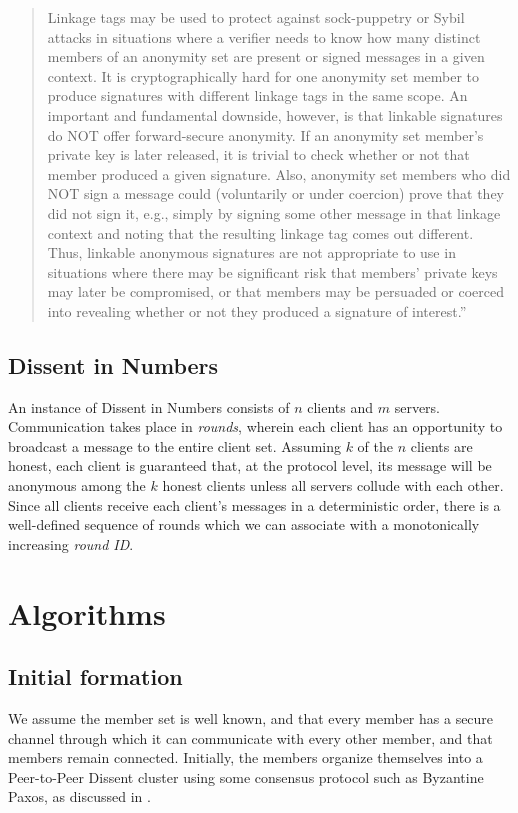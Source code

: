 \begin{quote}
Linkage tags may be used to protect against sock-puppetry or Sybil attacks in
situations where a verifier needs to know how many distinct members of an
anonymity set are present or signed messages in a given context. It is
cryptographically hard for one anonymity set member to produce signatures with
different linkage tags in the same scope. An important and fundamental downside,
however, is that linkable signatures do NOT offer forward-secure anonymity. If
an anonymity set member's private key is later released, it is trivial to check
whether or not that member produced a given signature. Also, anonymity set
members who did NOT sign a message could (voluntarily or under coercion) prove
that they did not sign it, e.g., simply by signing some other message in that
linkage context and noting that the resulting linkage tag comes out different.
Thus, linkable anonymous signatures are not appropriate to use in situations
where there may be significant risk that members' private keys may later be
compromised, or that members may be persuaded or coerced into revealing whether
or not they produced a signature of interest.''
\end{quote}
\cite{golrs}
\subsection{Dissent in Numbers}
An instance of Dissent in Numbers consists of $n$ clients and $m$ servers.
Communication takes place in \emph{rounds}, wherein each client has an
opportunity to broadcast a message to the entire client set. Assuming $k$ of the
$n$ clients are honest, each client is guaranteed that, at the protocol level,
its message will be anonymous among the $k$ honest clients unless all servers
collude with each other. Since all clients receive
  each client's messages in a deterministic order, there is a well-defined
  sequence of rounds which we can associate with a monotonically increasing
  \emph{round ID}.

\section{Algorithms}
\subsection{Initial formation}
We assume the member set is well known, and that every member has a secure
channel through which it can communicate with every other member, and that
members remain connected. Initially, the
members organize themselves into a Peer-to-Peer Dissent
cluster \cite{p2pd} using some consensus protocol such
as Byzantine Paxos, as discussed in \cite{sec}.

